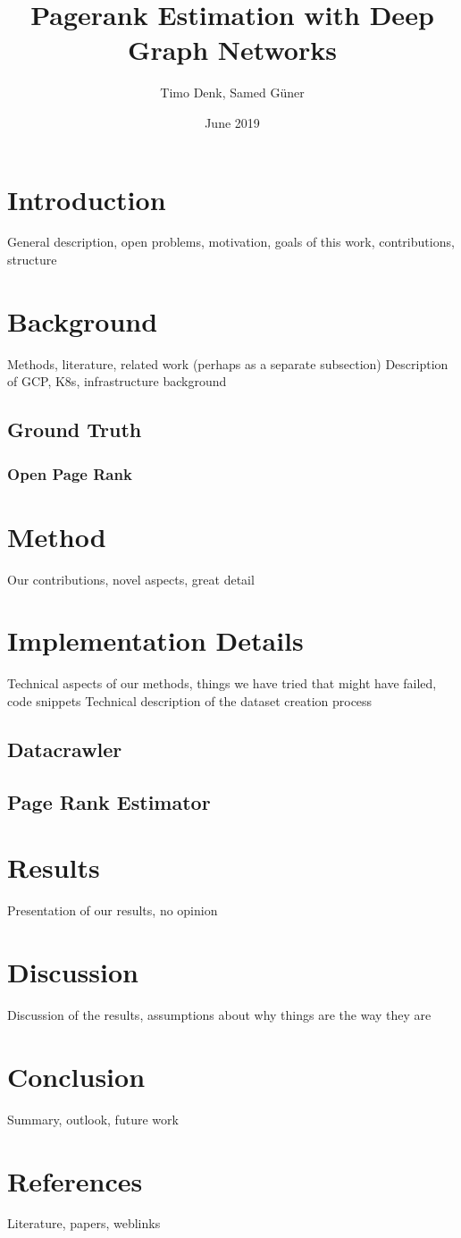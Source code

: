 \documentclass{article}
\title{Pagerank Estimation with Deep Graph Networks}
\author{Timo Denk, Samed Güner}
\date{June 2019}
\begin{document}
\maketitle

\section{Introduction}
General description, open problems, motivation, goals of this work, contributions, structure

\section{Background}
Methods, literature, related work (perhaps as a separate subsection)
Description of GCP, K8s, infrastructure background

\subsection{Ground Truth}
\subsubsection{Open Page Rank}
\label{OpenPageRank}

\section{Method}
Our contributions, novel aspects, great detail



\section{Implementation Details}
Technical aspects of our methods, things we have tried that might have failed, code snippets
Technical description of the dataset creation process

\subsection{Datacrawler}
\label{Datacrawler}
\subsection{Page Rank Estimator}
\section{Results}
Presentation of our results, no opinion

\section{Discussion}
Discussion of the results, assumptions about why things are the way they are

\section{Conclusion}
Summary, outlook, future work

\section{References}
Literature, papers, weblinks
\end{document}
